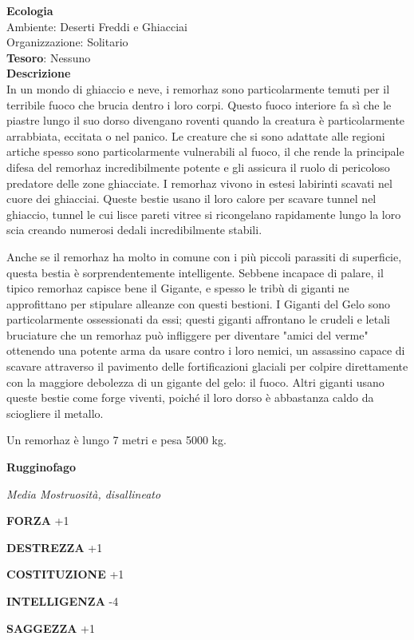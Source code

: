 \begin{multicols}{2}
\textbf{Ecologia}\\
Ambiente: Deserti Freddi e Ghiacciai\\
Organizzazione: Solitario\\
\textbf{Tesoro}: Nessuno\\
\textbf{Descrizione}\\
In un mondo di ghiaccio e neve, i remorhaz sono particolarmente temuti per il terribile fuoco che brucia dentro i loro corpi. Questo fuoco interiore fa sì che le piastre lungo il suo dorso divengano roventi quando la creatura è particolarmente arrabbiata, eccitata o nel panico. Le creature che si sono adattate alle regioni artiche spesso sono particolarmente vulnerabili al fuoco, il che rende la principale difesa del remorhaz incredibilmente potente e gli assicura il ruolo di pericoloso predatore delle zone ghiacciate. I remorhaz vivono in estesi labirinti scavati nel cuore dei ghiacciai. Queste bestie usano il loro calore per scavare tunnel nel ghiaccio, tunnel le cui lisce pareti vitree si ricongelano rapidamente lungo la loro scia creando numerosi dedali incredibilmente stabili.

Anche se il remorhaz ha molto in comune con i più piccoli parassiti di superficie, questa bestia è sorprendentemente intelligente. Sebbene incapace di palare, il tipico remorhaz capisce bene il Gigante, e spesso le tribù di giganti ne approfittano per stipulare alleanze con questi bestioni. I Giganti del Gelo sono particolarmente ossessionati da essi; questi giganti affrontano le crudeli e letali bruciature che un remorhaz può infliggere per diventare "amici del verme" ottenendo una potente arma da usare contro i loro nemici, un assassino capace di scavare attraverso il pavimento delle fortificazioni glaciali per colpire direttamente con la maggiore debolezza di un gigante del gelo: il fuoco. Altri giganti usano queste bestie come forge viventi, poiché il loro dorso è abbastanza caldo da sciogliere il metallo.

Un remorhaz è lungo 7 metri e pesa 5000 kg.



\medskip{}\textbf{Rugginofago}

\textit{Media Mostruosità, disallineato}

\textbf{FORZA} +1

\textbf{DESTREZZA} +1

\textbf{COSTITUZIONE} +1

\textbf{INTELLIGENZA} -4

\textbf{SAGGEZZA} +1


\end{multicols}
